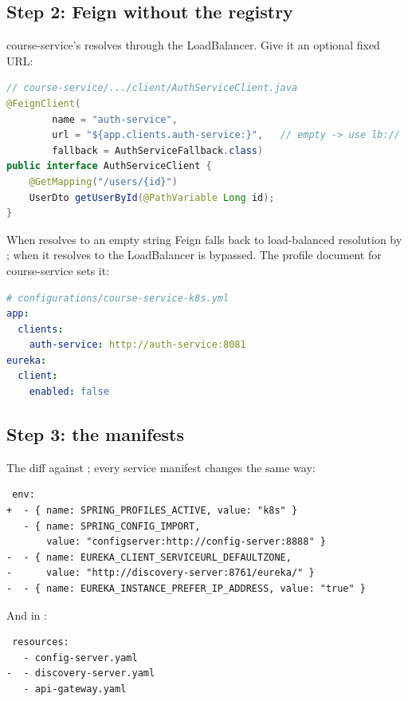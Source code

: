 \subsection{Step 2: Feign without the registry}

course-service's  resolves 
through the LoadBalancer. Give it an optional fixed URL:

\begin{lstlisting}[language=Java]
// course-service/.../client/AuthServiceClient.java
@FeignClient(
        name = "auth-service",
        url = "${app.clients.auth-service:}",   // empty -> use lb://
        fallback = AuthServiceFallback.class)
public interface AuthServiceClient {
    @GetMapping("/users/{id}")
    UserDto getUserById(@PathVariable Long id);
}
\end{lstlisting}

When  resolves to an empty string Feign falls back to
load-balanced resolution by ; when it resolves to
 the LoadBalancer is bypassed. The
profile document for course-service sets it:

\begin{lstlisting}[language=yaml]
# configurations/course-service-k8s.yml
app:
  clients:
    auth-service: http://auth-service:8081
eureka:
  client:
    enabled: false
\end{lstlisting}

\subsection{Step 3: the manifests}

The diff against ; every service
manifest changes the same way:

\begin{lstlisting}
 env:
+  - { name: SPRING_PROFILES_ACTIVE, value: "k8s" }
   - { name: SPRING_CONFIG_IMPORT,
       value: "configserver:http://config-server:8888" }
-  - { name: EUREKA_CLIENT_SERVICEURL_DEFAULTZONE,
-      value: "http://discovery-server:8761/eureka/" }
-  - { name: EUREKA_INSTANCE_PREFER_IP_ADDRESS, value: "true" }
\end{lstlisting}

And in :

\begin{lstlisting}
 resources:
   - config-server.yaml
-  - discovery-server.yaml
   - api-gateway.yaml
\end{lstlisting}

